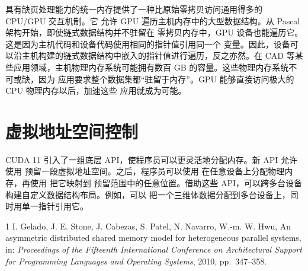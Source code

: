 具有缺页处理能力的统一内存提供了一种比原始零拷贝访问通用得多的 CPU/\allowbreak GPU
交互机制。它
允许 GPU 遍历主机内存中的大型数据结构。从 Pascal 架构开始，即使链式数据结构并不驻留在
零拷贝内存中，GPU 设备也能遍历它。这是因为主机代码和设备代码使用相同的指针值引用同一个
变量。因此，设备可以沿主机构建的链式数据结构中嵌入的指针值进行遍历，反之亦然。在 CAD
等某些应用领域，主机物理内存系统可能拥有数百 GB 的容量。这些物理内存系统不可或缺，因为
应用要求整个数据集都“驻留于内存”。GPU 能够直接访问极大的 CPU 物理内存以后，加速这些
应用就成为可能。

\section{虚拟地址空间控制}
\label{sec:appc-virtual-address-space-control}

CUDA 11 引入了一组底层 API，使程序员可以更灵活地分配内存。新 API 允许使用
 预留一段虚拟地址空间。之后，程序员可以使用
 在任意设备上分配物理内存，再使用  把它映射到
预留范围中的任意位置。借助这些 API，可以跨多台设备构建自定义数据结构布局。例如，可以
把一个三维体数据分配到多台设备上，同时用单一指针引用它。

\begin{chapterbibliography}{1}
  I. Gelado, J. E. Stone, J. Cabezas, S. Patel, N. Navarro, W.-m. W. Hwu,
  An asymmetric distributed shared memory model for heterogeneous parallel systems,
  in: \emph{Proceedings of the Fifteenth International Conference on Architectural
  Support for Programming Languages and Operating Systems}, 2010, pp.~347--358.
\end{chapterbibliography}
